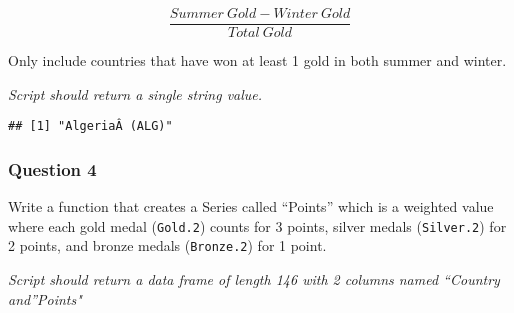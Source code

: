 \documentclass[
]{article}
\newenvironment{Shaded}{\begin{snugshade}}{\end{snugshade}}
\newcommand{\DataTypeTok}[1]{\textcolor[rgb]{0.13,0.29,0.53}{#1}}
\newcommand{\DecValTok}[1]{\textcolor[rgb]{0.00,0.00,0.81}{#1}}
\newcommand{\FloatTok}[1]{\textcolor[rgb]{0.00,0.00,0.81}{#1}}
\newcommand{\KeywordTok}[1]{\textcolor[rgb]{0.13,0.29,0.53}{\textbf{#1}}}
\newcommand{\NormalTok}[1]{#1}
\newcommand{\OperatorTok}[1]{\textcolor[rgb]{0.81,0.36,0.00}{\textbf{#1}}}
\newcommand{\StringTok}[1]{\textcolor[rgb]{0.31,0.60,0.02}{#1}}
\begin{document}
\[\frac{Summer~Gold - Winter~Gold}{Total~Gold}\]

Only include countries that have won at least 1 gold in both summer and
winter.

\emph{Script should return a single string value.}

\begin{Shaded}
\end{Shaded}

\begin{verbatim}
## [1] "AlgeriaÂ (ALG)"
\end{verbatim}

\hypertarget{question-4}{%
\subsubsection{Question 4}\label{question-4}}

Write a function that creates a Series called ``Points'' which is a
weighted value where each gold medal (\texttt{Gold.2}) counts for 3
points, silver medals (\texttt{Silver.2}) for 2 points, and bronze
medals (\texttt{Bronze.2}) for 1 point.

\emph{Script should return a data frame of length 146 with 2 columns
named ``Country and''Points"}

\begin{Shaded}
\end{Shaded}
\end{document}
